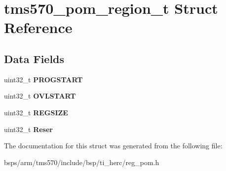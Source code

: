 \hypertarget{structtms570__pom__region__t}{}\section{tms570\+\_\+pom\+\_\+region\+\_\+t Struct Reference}
\label{structtms570__pom__region__t}
\subsection*{Data Fields}
\begin{DoxyCompactItemize}
\item 
\mbox{\label{structtms570__pom__region__t_a6bc74928fd2099b1d060863646268e4f}} 
uint32\+\_\+t {\bfseries P\+R\+O\+G\+S\+T\+A\+RT}
\item 
\mbox{\label{structtms570__pom__region__t_a2381f11300d2d57c9a0369275ddccedd}} 
uint32\+\_\+t {\bfseries O\+V\+L\+S\+T\+A\+RT}
\item 
\mbox{\label{structtms570__pom__region__t_a5c280bf1bc7eda77291619ea850c67f2}} 
uint32\+\_\+t {\bfseries R\+E\+G\+S\+I\+ZE}
\item 
\mbox{\label{structtms570__pom__region__t_a6884575bad8a6c834f993aafabe0baa0}} 
uint32\+\_\+t {\bfseries Reser}
\end{DoxyCompactItemize}


The documentation for this struct was generated from the following file\+:\begin{DoxyCompactItemize}
\item 
bsps/arm/tms570/include/bsp/ti\+\_\+herc/reg\+\_\+pom.\+h\end{DoxyCompactItemize}
